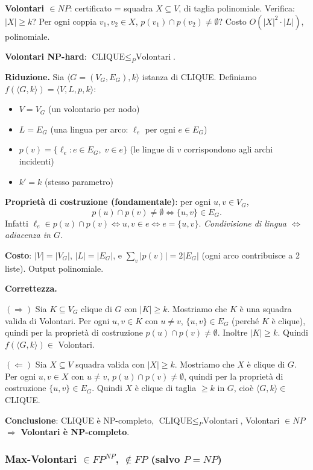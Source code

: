 \documentclass{report}
\begin{document}
\textbf{Volontari $\in NP$}: certificato = squadra $X \subseteq V$, di taglia polinomiale. Verifica: $|X| \geq k$? Per ogni coppia $v_1, v_2 \in X$, $p(v_1) \cap p(v_2) \neq \emptyset$? Costo $O(|X|^2 \cdot |L|)$, polinomiale.

\textbf{Volontari NP-hard}: $\text{CLIQUE} \leq_P \text{Volontari}$.

\textbf{Riduzione.} Sia $\langle G = (V_G, E_G), k\rangle$ istanza di CLIQUE. Definiamo $f(\langle G, k\rangle) = \langle V, L, p, k\rangle$:
\begin{itemize}
  \item $V = V_G$ (un volontario per nodo)
  \item $L = E_G$ (una lingua per arco: $\ell_e$ per ogni $e \in E_G$)
  \item $p(v) = \{\ell_e : e \in E_G,\; v \in e\}$ (le lingue di $v$ corrispondono agli archi incidenti)
  \item $k' = k$ (stesso parametro)
\end{itemize}

\textbf{Proprietà di costruzione (fondamentale)}: per ogni $u, v \in V_G$,
\[
  p(u) \cap p(v) \neq \emptyset \iff \{u, v\} \in E_G.
\]
Infatti $\ell_e \in p(u) \cap p(v) \iff u, v \in e \iff e = \{u, v\}$. \emph{Condivisione di lingua $\iff$ adiacenza in $G$.}

\textbf{Costo}: $|V| = |V_G|$, $|L| = |E_G|$, e $\sum_v |p(v)| = 2|E_G|$ (ogni arco contribuisce a 2 liste). Output polinomiale.

\textbf{Correttezza.}

$(\Rightarrow)$ Sia $K \subseteq V_G$ clique di $G$ con $|K| \geq k$. Mostriamo che $K$ è una squadra valida di Volontari. Per ogni $u, v \in K$ con $u \neq v$, $\{u, v\} \in E_G$ (perché $K$ è clique), quindi per la proprietà di costruzione $p(u) \cap p(v) \neq \emptyset$. Inoltre $|K| \geq k$. Quindi $f(\langle G, k\rangle) \in$ Volontari.

$(\Leftarrow)$ Sia $X \subseteq V$ squadra valida con $|X| \geq k$. Mostriamo che $X$ è clique di $G$. Per ogni $u, v \in X$ con $u \neq v$, $p(u) \cap p(v) \neq \emptyset$, quindi per la proprietà di costruzione $\{u, v\} \in E_G$. Quindi $X$ è clique di taglia $\geq k$ in $G$, cioè $\langle G, k\rangle \in$ CLIQUE.

\textbf{Conclusione}: CLIQUE è NP-completo, $\text{CLIQUE} \leq_P \text{Volontari}$, Volontari $\in NP$ $\Rightarrow$ \textbf{Volontari è NP-completo}.

\subsubsection*{Max-Volontari $\in FP^{NP}$, $\notin FP$ (salvo $P = NP$)}
\end{document}
